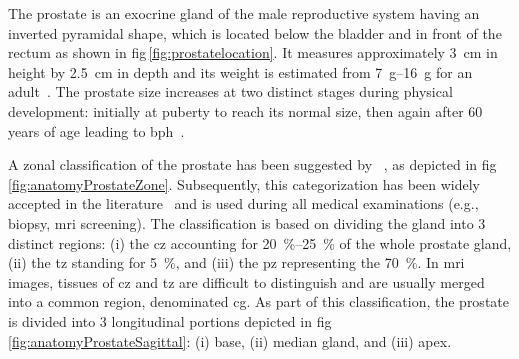 The prostate is an exocrine gland of the male reproductive system having an inverted pyramidal shape, which is located below the bladder and in front of the rectum as shown in \acs{fig}\,\ref{fig:prostatelocation}.
It measures approximately \SI{3}{\cm} in height by \SI{2.5}{\cm} in depth and its weight is estimated from \SIrange{7}{16}{\gram} for an adult~\cite{Leissner1979}.
The prostate size increases at two distinct stages during physical development: initially at puberty to reach its normal size, then again after 60 years of age leading to \ac{bph}~\cite{Parfait2010}.

A zonal classification of the prostate has been suggested by \citeauthor{McNeal1981}~\cite{McNeal1981}, as depicted in \acs{fig}\,\ref{fig:anatomyProstateZone}.
Subsequently, this categorization has been widely accepted in the literature~\cite{Hricak1987,Villers1991,Coakley2000,Parfait2010} and is used during all medical examinations (e.g., biopsy, \ac{mri} screening).
The classification is based on dividing the gland into 3 distinct regions: (i) the \ac{cz} accounting for \SIrange{20}{25}{\percent} of the whole prostate gland, (ii) the \ac{tz} standing for \SI{5}{\percent}, and (iii) the \ac{pz} representing the \SI{70}{\percent}.
In \ac{mri} images, tissues of \ac{cz} and \ac{tz} are difficult to distinguish and are usually merged into a common region, denominated \ac{cg}.
As part of this classification, the prostate is divided into 3 longitudinal portions depicted in \acs{fig}\,\ref{fig:anatomyProstateSagittal}: (i) base, (ii) median gland, and (iii) apex.





